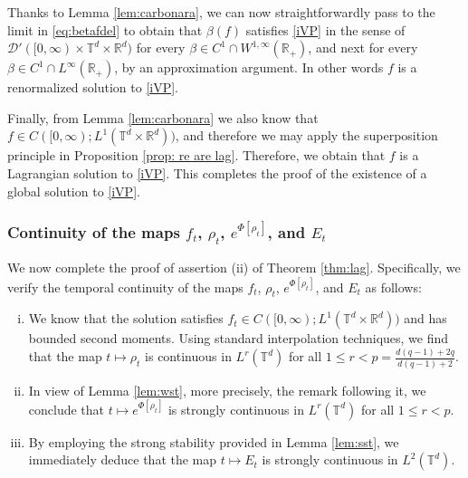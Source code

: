 \documentclass[11pt,reqno,a4paper]{amsart}
\newcommand{\R}{\mathbb{R}}
\theoremstyle{definition}
\theoremstyle{remark}
\numberwithin{equation}{section}
\newcommand{\T} {\mathbb T}
\newcommand{\calD}{\mathcal D}
\begin{document}
Thanks to Lemma \ref{lem:carbonara}, we can now straightforwardly pass to the limit in \eqref{eq:betafdel} to obtain that $\beta(f)$ satisfies \eqref{iVP} in the sense of $\calD'([0,\infty)\times \T^d\times\R^d)$ for every $\beta\in C^1\cap W^{1,\infty}(\R_+)$, and next for every $\beta\in C^1\cap L^\infty(\R_+)$, by an approximation argument. In other words $f$ is a renormalized solution to \eqref{iVP}.

Finally, from Lemma \ref{lem:carbonara} we also know that $f\in C([0,\infty);L^1(\T^d\times\R^d))$, and therefore we may apply the superposition principle in Proposition \ref{prop: re are lag}. Therefore, we obtain that $f$ is a Lagrangian solution to \eqref{iVP}. This completes the proof of the existence of a global solution to \eqref{iVP}.







\subsubsection{Continuity of the maps $f_t$, $\rho_t$, $e^{\Phi[\rho_t]}$, and $E_t$}
We now complete the proof of assertion (ii) of Theorem \ref{thm:lag}. Specifically, we verify the temporal continuity of the maps $f_t$, $\rho_t$, $e^{\Phi[\rho_t]}$, and $E_t$ as follows:
\begin{enumerate}[(i)]
\item We know that the solution satisfies $f_t \in C([0,\infty);L^1(\T^d \times \R^d))$ and has bounded second moments. Using standard interpolation techniques, we find that the map $t\mapsto \rho_t$ is continuous in $L^{r}(\T^d)$ for all $1\le r< p= \frac{d(q-1)+2q}{d(q-1)+2}$.
\item In view of Lemma \ref{lem:wst}, more precisely, the remark following it, we conclude that $t\mapsto e^{\Phi[\rho_t]}$ is strongly continuous in $L^r(\T^d)$ for all $1\le r < p$.
\item By employing the strong stability provided in Lemma \ref{lem:sst}, we immediately deduce that the map $t\mapsto E_t$ is strongly continuous in $L^2(\T^d)$.
\end{enumerate}
\end{document}
